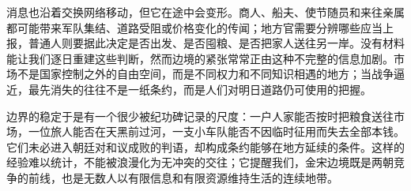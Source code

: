 消息也沿着交换网络移动，但它在途中会变形。商人、船夫、使节随员和来往亲属都可能带来军队集结、道路受阻或价格变化的传闻；地方官需要分辨哪些应当上报，普通人则要据此决定是否出发、是否囤粮、是否把家人送往另一岸。没有材料能让我们逐日重建这些判断，然而边境的紧张常常正由这种不完整的信息加剧。市场不是国家控制之外的自由空间，而是不同权力和不同知识相遇的地方；当战争逼近，最先消失的往往不是一纸条约，而是人们对明日道路仍可使用的把握。

边界的稳定于是有一个很少被纪功碑记录的尺度：一户人家能否按时把粮食送往市场，一位旅人能否在天黑前过河，一支小车队能否不因临时征用而失去全部本钱。它们未必进入朝廷对和议成败的判语，却构成条约能够在地方延续的条件。这样的经验难以统计，不能被浪漫化为无冲突的交往；它提醒我们，金宋边境既是两朝竞争的前线，也是无数人以有限信息和有限资源维持生活的连续地带。
